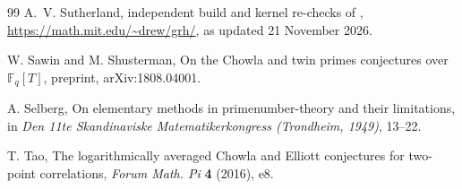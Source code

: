 \documentclass[11pt]{article}
\theoremstyle{definition}
\theoremstyle{remark}
\begin{document}
\begin{thebibliography}{99}
 A.~V. Sutherland, independent build and kernel re-checks of
\cite{rhclaim}, \url{https://math.mit.edu/~drew/grh/}, as updated 21 November
2026.

 W. Sawin and M. Shusterman, On the Chowla and twin
primes conjectures over $\mathbb{F}_q[T]$, preprint, arXiv:1808.04001.

 A. Selberg, On elementary methods in primenumber-theory and
their limitations, in \emph{Den 11te Skandinaviske Matematikerkongress
(Trondheim, 1949)}, 13--22.

 T. Tao, The logarithmically averaged Chowla and Elliott
conjectures for two-point correlations, \emph{Forum Math. Pi} \textbf{4} (2016),
e8.

\end{thebibliography}
\end{document}
